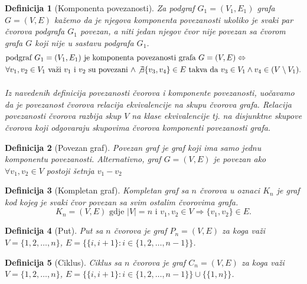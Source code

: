 \documentclass[11pt]{article}
\newtheorem{definition}{Definicija}
\begin{document}
		\begin{definition}[Komponenta povezanosti]
		Za podgraf $G_1 = (V_1, E_1)$ grafa $G = (V, E)$ kažemo da je njegova komponenta povezanosti ukoliko je svaki par čvorova podgrafa $G_1$ povezan, a niti jedan njegov čvor nije povezan sa čvorom grafa $G$ koji nije u sastavu podgrafa $G_1$. 
		\[
			\begin{split}
			&\text{podgraf } G_1 = (V_1, E_1) \text{ je komponenta povezanosti grafa } G = (V, E)  \Leftrightarrow \\
			& \forall v_1,v_2 \in V_1 \text{ važi } v_1 \text{ i } v_2 \text{ su povezani } \land \not \exists \{v_3, v_4\} \in E \text{ takva da } v_3 \in V_1 \land v_4 \in (V \setminus V_1) \text{.}
			\end{split}
		\]
			\paragraph{}
			Iz navedenih definicija povezanosti čvorova i komponente povezanosti, uočavamo da je povezanost čvorova relacija ekvivalencije na skupu čvorova grafa.
			Relacija povezanosti čvorova razbija skup $V$ na klase ekvivalencije tj. na disjunktne skupove čvorova koji odgovaraju skupovima čvorova komponenti povezanosti grafa. 
		\end{definition}
	
		\begin{definition}[Povezan graf]
		Povezan graf je graf koji ima samo jednu komponentu povezanosti. 
		Alternativno, graf $G=(V,E)$ je povezan ako $\forall v_1,v_2 \in V$ postoji šetnja $v_1-v_2$
		\end{definition}
	
		\begin{definition}[Kompletan graf]
		Kompletan graf sa $n$ čvorova u oznaci $K_n$ je graf kod kojeg je svaki čvor povezan sa svim ostalim čvorovima grafa. 
		\[ 
			K_n = (V,E) \text{ gdje } |V| = n \text{ i } v_1,v_2 \in V \Rightarrow \{v_1,v_2\} \in E.
		\]
		\end{definition}
		
		\begin{definition}[Put]
		Put sa $n$ čvorova je graf $P_n=(V,E)$ za koga važi $V = \{1,2, \dots ,n\}$, $E = \{\{i, i+1\} : i \in \{1,2, \dots , n-1\}\}$.
		\end{definition}
		
		\begin{definition}[Ciklus]
		Ciklus sa $n$ čvorova je graf $C_n=(V,E)$ za koga važi $V = \{1,2, \dots ,n\}$, $E = \{\{i, i+1\} : i \in \{1,2, \dots , n-1\} \} \cup \{\{1,n\}\}$.
		\end{definition}
	
\end{document}
